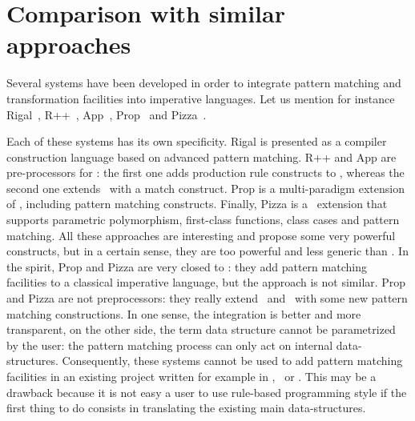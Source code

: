 

\section{Comparison with similar approaches}
Several systems have been developed in order to integrate pattern
matching and transformation facilities into imperative languages. 
Let us mention for instance \textsf{Rigal}~\cite{AugustonMi1990a,Rigal},
\textsf{R++}~\cite{CrawfordDLMP-AAAI96,Rpp}, 
\textsf{App}~\cite{App}, \textsf{Prop}~\cite{Prop} and
\textsf{Pizza}~\cite{}. 

Each of these systems has its own specificity. 
\textsf{Rigal} is presented as
a compiler construction language based on advanced pattern matching.
\textsf{R++} and \textsf{App} are pre-processors for \Cplusplus: the first
one adds production rule constructs to \Cplusplus, whereas the second one
extends \Cplusplus\ with a match construct. \textsf{Prop} is a multi-paradigm
extension of \Cplusplus, including pattern matching constructs.
Finally, \textsf{Pizza} is a \Java\ extension that supports 
parametric polymorphism, first-class functions, class cases and
pattern matching. 
All these approaches are interesting and propose some very powerful
constructs, but in a certain sense, they are too powerful and less
generic than \TOM. 
In the spirit, \textsf{Prop} and \textsf{Pizza} are very closed to
\TOM: they add pattern matching facilities to a classical imperative
language, but the approach is not similar.
\textsf{Prop} and \textsf{Pizza} are not preprocessors: they really
extend \Cplusplus\ and \Java\ with some new pattern matching
constructions. In one sense, the integration is better and more
transparent, on the other side, the term data structure cannot be
parametrized by the user: the pattern matching process can only act on 
internal data-structures.  
Consequently, these systems cannot be used to add pattern matching
facilities in an existing project written for example in \C,
\Cplusplus\ or \Java. This may be a drawback because it is not easy a
user to use rule-based programming style if the first thing to do
consists in translating the existing main data-structures.
